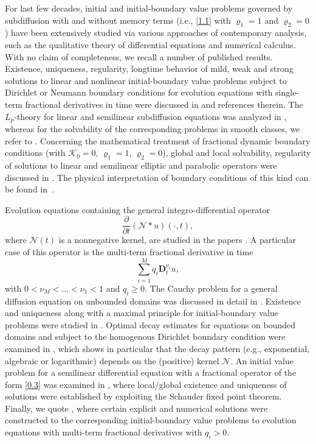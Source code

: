 \documentclass[reqno]{amsart}
\theoremstyle{definition}
\numberwithin{equation}{section}
\begin{document}
For last few decades, initial and initial-boundary value problems governed by subdiffusion with and without memory terms (i.e., \eqref{1.1} with $\varrho_1=1$ and $\varrho_2=0$) have been extensively studied via various approaches of contemporary analysis, such as the qualitative theory of differential equations and numerical calculus. With no claim of completeness, we recall
a number of published results. Existence, uniqueness, regularity, longtime behavior of  mild, weak and strong solutions to linear and nonlinear initial-boundary value problems subject to Dirichlet or Neumann boundary conditions for evolution equations with single-term fractional derivatives in time  were discussed in \cite{CGL,J,KSVZ,LG,VZ} and references therein. The $L_{p}$-theory for linear and semilinear subdiffusion equations was analyzed in \cite{KKL,Ya,Z}, whereas
for the solvability of the corresponding problems in smooth classes,  we refer to \cite{K2,KV1,KV2,KPV1,KPV3,KR,LY}.
Concerning the  mathematical treatment of fractional dynamic boundary conditions
(with $\mathcal{K}_{0}=0$, $\varrho_{1}=1$, $\varrho_2=0$),
global and local solvability, regularity of solutions to linear and semilinear elliptic and parabolic operators were discussed in \cite{Go,GW,K1,KT,KV1,VV}. The physical interpretation of
boundary conditions of this kind can be found in~\cite{Go,VV}.

Evolution equations containing the general integro-differential operator
\begin{equation}\label{0.3}
\frac{\partial}{\partial t}(\mathcal{N}* u)(\cdot,t),
\end{equation}
where $\mathcal{N}(t)$ is a nonnegative kernel,
are studied in the papers \cite{SSMC,SMC}. A particular case
of this operator is the multi-term fractional derivative in time
$$\sum_{i=1}^{M}q_{i}\mathbf{D}_{t}^{\nu_{i}}u,$$
with $0<\nu_{M}<\ldots<\nu_{1}<1$ and $q_{i}\geq 0$.
The Cauchy problem for a general diffusion equation on unbounded domains was discussed in detail in \cite{Ko}. Existence and uniqueness along with a maximal principle for initial-boundary value problems were studied in \cite{LY,KPV1,LYa,LSY,LLY}. Optimal decay estimates for equations on bounded domains and subject to the homogenous Dirichlet boundary condition were examined in \cite{VZ2}, which
shows in particular that the decay pattern
(e.g., exponential, algebraic or logarithmic) depends on
the (positive) kernel $\mathcal{N}$. An initial value problem for a semilinear differential equation with a fractional operator of the form \eqref{0.3} was examined in \cite{S}, where
local/global existence and uniqueness of solutions were established
by exploiting the Schauder fixed point theorem.
Finally, we quote \cite{JDM, MGSKA,SR,ZLLA}, where certain explicit and numerical solutions were constructed to the corresponding initial-boundary value problems to evolution equations with  multi-term fractional derivatives with $q_{i}> 0$.
\end{document}
